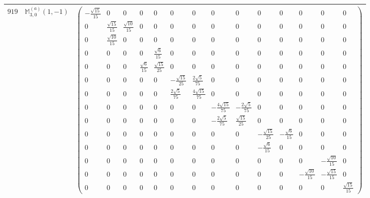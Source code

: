 \documentclass[fleqn,8pt,landscape]{jsarticle}
\begin{document}
\begin{center}
\begin{longtable}{ccc}
$ 919 $ & $ \mathbb{M}_{3,0}^{(a)}(1,-1) $ & $ \begin{pmatrix} - \frac{\sqrt{15}}{15} & 0 & 0 & 0 & 0 & 0 & 0 & 0 & 0 & 0 & 0 & 0 & 0 & 0 \\ 0 & \frac{\sqrt{15}}{15} & \frac{\sqrt{10}}{15} & 0 & 0 & 0 & 0 & 0 & 0 & 0 & 0 & 0 & 0 & 0 \\ 0 & \frac{\sqrt{10}}{15} & 0 & 0 & 0 & 0 & 0 & 0 & 0 & 0 & 0 & 0 & 0 & 0 \\ 0 & 0 & 0 & 0 & \frac{\sqrt{6}}{15} & 0 & 0 & 0 & 0 & 0 & 0 & 0 & 0 & 0 \\ 0 & 0 & 0 & \frac{\sqrt{6}}{15} & \frac{\sqrt{15}}{25} & 0 & 0 & 0 & 0 & 0 & 0 & 0 & 0 & 0 \\ 0 & 0 & 0 & 0 & 0 & - \frac{\sqrt{15}}{25} & \frac{2 \sqrt{5}}{75} & 0 & 0 & 0 & 0 & 0 & 0 & 0 \\ 0 & 0 & 0 & 0 & 0 & \frac{2 \sqrt{5}}{75} & \frac{4 \sqrt{15}}{75} & 0 & 0 & 0 & 0 & 0 & 0 & 0 \\ 0 & 0 & 0 & 0 & 0 & 0 & 0 & - \frac{4 \sqrt{15}}{75} & - \frac{2 \sqrt{5}}{75} & 0 & 0 & 0 & 0 & 0 \\ 0 & 0 & 0 & 0 & 0 & 0 & 0 & - \frac{2 \sqrt{5}}{75} & \frac{\sqrt{15}}{25} & 0 & 0 & 0 & 0 & 0 \\ 0 & 0 & 0 & 0 & 0 & 0 & 0 & 0 & 0 & - \frac{\sqrt{15}}{25} & - \frac{\sqrt{6}}{15} & 0 & 0 & 0 \\ 0 & 0 & 0 & 0 & 0 & 0 & 0 & 0 & 0 & - \frac{\sqrt{6}}{15} & 0 & 0 & 0 & 0 \\ 0 & 0 & 0 & 0 & 0 & 0 & 0 & 0 & 0 & 0 & 0 & 0 & - \frac{\sqrt{10}}{15} & 0 \\ 0 & 0 & 0 & 0 & 0 & 0 & 0 & 0 & 0 & 0 & 0 & - \frac{\sqrt{10}}{15} & - \frac{\sqrt{15}}{15} & 0 \\ 0 & 0 & 0 & 0 & 0 & 0 & 0 & 0 & 0 & 0 & 0 & 0 & 0 & \frac{\sqrt{15}}{15} \end{pmatrix} $ \\ \hline

\end{longtable}
\end{center}
\end{document}
